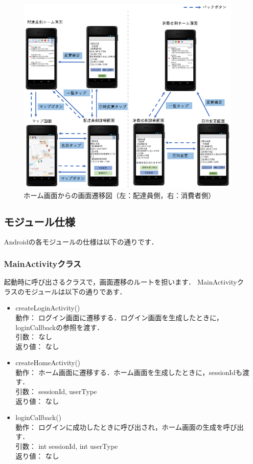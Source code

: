 \documentclass[a4j,titlepage]{jarticle}
\begin{document}
\begin{figure}[H]
 \begin{center}
  \includegraphics[width=150mm]{screen_transition_home.png}
  \caption{ホーム画面からの画面遷移図（左：配達員側，右：消費者側）}
  \label{fig:home}
 \end{center}
\end{figure}
\subsection{モジュール仕様}
Androidの各モジュールの仕様は以下の通りです．

\subsubsection{MainActivityクラス}
起動時に呼び出さるクラスで，画面遷移のルートを担います．
MainActivityクラスのモジュールは以下の通りであす．

\begin{itemize}
\item createLoginActivity()\\
動作： ログイン画面に遷移する．ログイン画面を生成したときに，loginCallbackの参照を渡す．\\
引数： なし\\
返り値： なし

\item createHomeActivity()\\
動作： ホーム画面に遷移する．ホーム画面を生成したときに，sessionIdも渡す．\\
引数： sessionId, userType\\
返り値： なし

\item loginCallback()\\
動作： ログインに成功したときに呼び出され，ホーム画面の生成を呼び出す．\\
引数： int sessionId, int userType\\
返り値： なし
\end{itemize}
\end{document}
